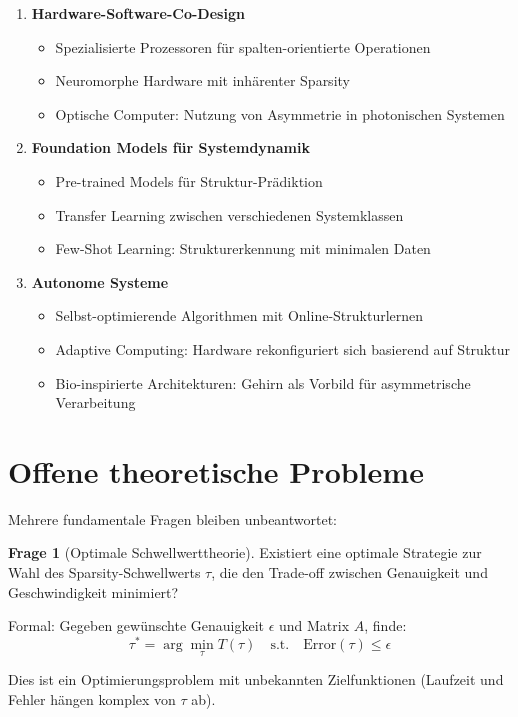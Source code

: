 ﻿\documentclass[a4paper,12pt]{report}
\theoremstyle{definition}
\newtheorem{frage}{Frage}
\begin{document}
	\begin{enumerate}
		\item \textbf{Hardware-Software-Co-Design}
		\begin{itemize}
			\item Spezialisierte Prozessoren für spalten-orientierte Operationen
			\item Neuromorphe Hardware mit inhärenter Sparsity
			\item Optische Computer: Nutzung von Asymmetrie in photonischen Systemen
		\end{itemize}
		
		\item \textbf{Foundation Models für Systemdynamik}
		\begin{itemize}
			\item Pre-trained Models für Struktur-Prädiktion
			\item Transfer Learning zwischen verschiedenen Systemklassen
			\item Few-Shot Learning: Strukturerkennung mit minimalen Daten
		\end{itemize}
		
		\item \textbf{Autonome Systeme}
		\begin{itemize}
			\item Selbst-optimierende Algorithmen mit Online-Strukturlernen
			\item Adaptive Computing: Hardware rekonfiguriert sich basierend auf Struktur
			\item Bio-inspirierte Architekturen: Gehirn als Vorbild für asymmetrische Verarbeitung
		\end{itemize}
	\end{enumerate}
	
	\section{Offene theoretische Probleme}
	
	Mehrere fundamentale Fragen bleiben unbeantwortet:
	
	\begin{frage}[Optimale Schwellwerttheorie]
		Existiert eine optimale Strategie zur Wahl des Sparsity-Schwellwerts $\tau$, die den Trade-off zwischen Genauigkeit und Geschwindigkeit minimiert?
		
		Formal: Gegeben gewünschte Genauigkeit $\epsilon$ und Matrix $A$, finde:
		\[
		\tau^* = \arg\min_{\tau} T(\tau) \quad \text{s.t.} \quad \text{Error}(\tau) \leq \epsilon
		\]
		
		Dies ist ein Optimierungsproblem mit unbekannten Zielfunktionen (Laufzeit und Fehler hängen komplex von $\tau$ ab).
	\end{frage}
	
\end{document}
